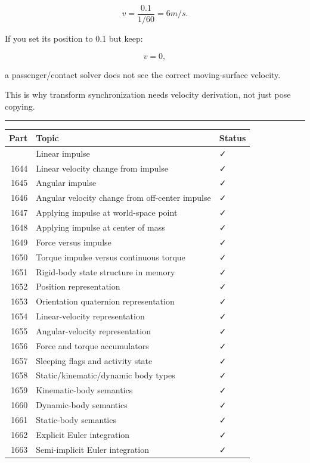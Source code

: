 \[
v
=
\frac{0.1}{1/60}
=
6m/s.
\]

If you set its position to 0.1 but keep:

\[
v=0,
\]

a passenger/contact solver does not see the correct moving-surface velocity.

This is why transform synchronization needs velocity derivation, not just pose copying.

\begin{center}\rule{0.5\linewidth}{0.5pt}\end{center}

{\def\LTcaptype{none} %
\begin{longtable}[]{@{}rll@{}}
\toprule\noalign{}
Part & Topic & Status \\
\midrule\noalign{}
\endhead
\bottomrule\noalign{}
\endlastfoot
1643 & Linear impulse & ✓ \\
1644 & Linear velocity change from impulse & ✓ \\
1645 & Angular impulse & ✓ \\
1646 & Angular velocity change from off-center impulse & ✓ \\
1647 & Applying impulse at world-space point & ✓ \\
1648 & Applying impulse at center of mass & ✓ \\
1649 & Force versus impulse & ✓ \\
1650 & Torque impulse versus continuous torque & ✓ \\
1651 & Rigid-body state structure in memory & ✓ \\
1652 & Position representation & ✓ \\
1653 & Orientation quaternion representation & ✓ \\
1654 & Linear-velocity representation & ✓ \\
1655 & Angular-velocity representation & ✓ \\
1656 & Force and torque accumulators & ✓ \\
1657 & Sleeping flags and activity state & ✓ \\
1658 & Static/kinematic/dynamic body types & ✓ \\
1659 & Kinematic-body semantics & ✓ \\
1660 & Dynamic-body semantics & ✓ \\
1661 & Static-body semantics & ✓ \\
1662 & Explicit Euler integration & ✓ \\
1663 & Semi-implicit Euler integration & ✓ \\

\end{longtable}}
